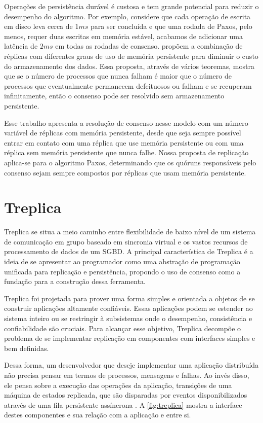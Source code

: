 Operações de persistência durável é custosa e tem grande potencial para reduzir o
desempenho do algoritmo. Por exemplo, considere que cada operação de escrita em disco leva
cerca de $1ms$ para ser concluída e que uma rodada de Paxos, pelo menos, requer duas
escritas em memória estável, acabamos de adicionar uma latência de $2ms$ em todas as
rodadas de consenso.  propõem a combinação de réplicas com
diferentes graus de uso de memória persistente para diminuir o custo do armazenamento dos
dados. Essa proposta, através de vários teoremas, mostra que se o número de processos que
nunca falham é maior que o número de processos que eventualmente permanecem defeituosos ou
falham e se recuperam infinitamente, então o consenso pode ser resolvido sem armazenamento
persistente.

Esse trabalho apresenta a resolução de consenso nesse modelo com um número variável de
réplicas com memória persistente, desde que seja sempre possível entrar em contato com
uma réplica que use memória persistente ou com uma réplica sem memória persistente que
nunca falhe. Nossa proposta de replicação aplica-se para o algoritmo Paxos, determinando
que os quóruns responsáveis pelo consenso sejam sempre compostos por réplicas que usam
memória persistente.


\section{Treplica}\label{sec:treplica}

Treplica se situa a meio caminho entre flexibilidade de baixo nível de um sistema de
comunicação em grupo \cite{birman93} baseado em sincronia virtual \cite{friedman96,
birman05} e os vastos recursos de processamento de dados de um SGBD. A principal
característica de Treplica é a ideia de se apresentar ao programador como uma abstração de
programação unificada para replicação e persistência, propondo o uso de consenso
\cite{barborak93} como a fundação para a construção dessa ferramenta.

Treplica foi projetada para prover uma forma simples e orientada a objetos de se construir
aplicações altamente confiáveis. Essas aplicações podem se estender ao sistema inteiro ou
se restringir à subsistemas onde o desempenho, consistência e confiabilidade são cruciais.
Para alcançar esse objetivo, Treplica decompõe o problema de se implementar replicação em
componentes com interfaces simples e bem definidas.

Dessa forma, um desenvolvedor que deseje implementar uma aplicação distribuída não precisa
pensar em termos de processos, mensagens e falhas. Ao invés disso, ele pensa sobre a
execução das operações da aplicação, transições de uma máquina de estados replicada, que
são disparadas por eventos disponibilizados através de uma fila persistente assíncrona
\cite{vieira-tr10b}. A \autoref{fig:treplica} mostra a interface destes componentes e sua
relação com a aplicação e entre si.

